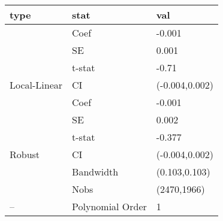 
\begin{tabular}{lll}
\toprule
type & stat & val\\
\midrule
 & Coef & -0.001\\

 & SE & 0.001\\

 & t-stat & -0.71\\

\multirow{-4}{*}{\raggedright\arraybackslash Local-Linear} & CI & (-0.004,0.002)\\
\cmidrule{1-3}
 & Coef & -0.001\\

 & SE & 0.002\\

 & t-stat & -0.377\\

\multirow{-4}{*}{\raggedright\arraybackslash Robust} & CI & (-0.004,0.002)\\
\cmidrule{1-3}
 & Bandwidth & (0.103,0.103)\\

 & Nobs & (2470,1966)\\

\multirow{-3}{*}{\raggedright\arraybackslash --} & Polynomial Order & 1\\
\bottomrule
\end{tabular}